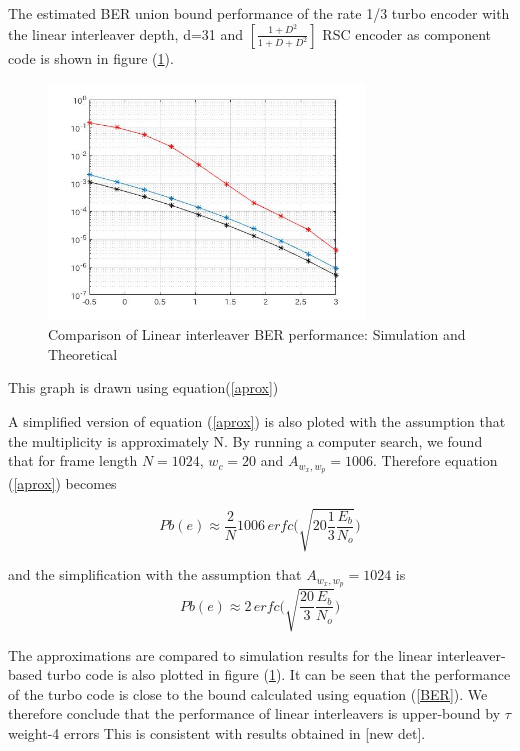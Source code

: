 \documentclass[20 pts]{article}
\begin{document}
  The estimated BER union bound performance of the rate 1/3 turbo encoder with
  the linear interleaver depth, d=31 and $[\frac{1+D^2}{1+D+D^2}]$ RSC encoder 
  as component code is shown in figure (\ref{comp}). 
  
\begin{figure}[h!]
\centering
		\includegraphics[width=0.75\textwidth]{D_31_N_1024_3.png}
		\caption{Comparison of Linear interleaver BER performance: Simulation and Theoretical}
		\label{comp}
		\end{figure}
	
  This graph is drawn using equation(\ref{aprox}) 
  
 
  
 A simplified version
  of equation (\ref{aprox}) is also ploted with the assumption that the multiplicity is approximately
  N. By running a computer search, we found that for frame length $N=1024$,
  $w_c= 20$ and $A_{w_x,w_p}=1006$. Therefore equation (\ref{aprox}) becomes
  
  \begin{equation}
  Pb(e) \approx \frac{2}{N} 1006 
  \,erfc \Bigg(\sqrt{20\frac{1}{3}\frac{E_b}{N_o}} \Bigg)
  \label{BER}
  \end{equation}
  
  and the simplification with the assumption that  $A_{w_x,w_p}=1024$ is 
   $$ Pb(e) \approx 2
 \, erfc \Bigg(\sqrt{\frac{20}{3}\frac{E_b}{N_o}} \Bigg)$$
 
 The approximations are compared to simulation results for the linear interleaver-based
 turbo code is also plotted in figure (\ref{comp}). It can be seen that the performance of the
 turbo code is close to the bound calculated using equation (\ref{BER}). We therefore conclude
 that the performance of linear interleavers is upper-bound by $\tau$ weight-4 errors
  This is consistent with results obtained in [new det].
\end{document}

